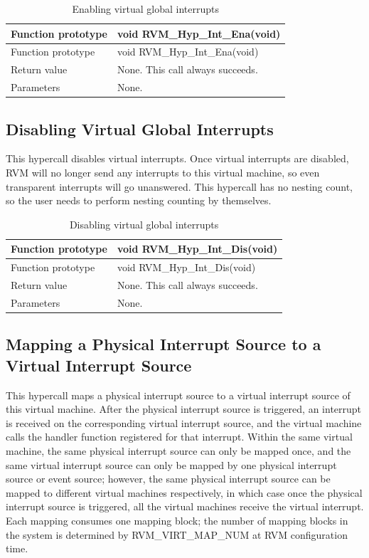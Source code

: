 \begin{xltabular}{\textwidth}{@{}>{\hsize\raggedright\arraybackslash}X>{\hsize\raggedright\arraybackslash}X@{}}
\caption{Enabling virtual global interrupts}\label{tab:4-7}\\
\toprule
Function prototype & void RVM\_\allowbreak{}Hyp\_\allowbreak{}Int\_\allowbreak{}Ena(void)\tabularnewline
\endfirsthead
\toprule
Function prototype & void RVM\_\allowbreak{}Hyp\_\allowbreak{}Int\_\allowbreak{}Ena(void)\tabularnewline
\midrule
\endhead
\bottomrule
\endlastfoot
Return value & None. This call always succeeds.\tabularnewline
Parameters & None.\tabularnewline
\end{xltabular}

\subsection{Disabling Virtual Global Interrupts}\label{subsec:4-4-4}

This hypercall disables virtual interrupts. Once virtual interrupts are disabled, RVM will no longer send any interrupts to this virtual machine, so even transparent interrupts will go unanswered. This hypercall has no nesting count, so the user needs to perform nesting counting by themselves.

\begin{xltabular}{\textwidth}{@{}>{\hsize\raggedright\arraybackslash}X>{\hsize\raggedright\arraybackslash}X@{}}
\caption{Disabling virtual global interrupts}\label{tab:4-8}\\
\toprule
Function prototype & void RVM\_\allowbreak{}Hyp\_\allowbreak{}Int\_\allowbreak{}Dis(void)\tabularnewline
\endfirsthead
\toprule
Function prototype & void RVM\_\allowbreak{}Hyp\_\allowbreak{}Int\_\allowbreak{}Dis(void)\tabularnewline
\midrule
\endhead
\bottomrule
\endlastfoot
Return value & None. This call always succeeds.\tabularnewline
Parameters & None.\tabularnewline
\end{xltabular}

\subsection{Mapping a Physical Interrupt Source to a Virtual Interrupt Source}\label{subsec:4-4-5}

This hypercall maps a physical interrupt source to a virtual interrupt source of this virtual machine. After the physical interrupt source is triggered, an interrupt is received on the corresponding virtual interrupt source, and the virtual machine calls the handler function registered for that interrupt. Within the same virtual machine, the same physical interrupt source can only be mapped once, and the same virtual interrupt source can only be mapped by one physical interrupt source or event source; however, the same physical interrupt source can be mapped to different virtual machines respectively, in which case once the physical interrupt source is triggered, all the virtual machines receive the virtual interrupt. Each mapping consumes one mapping block; the number of mapping blocks in the system is determined by RVM\_VIRT\_MAP\_NUM at RVM configuration time.

